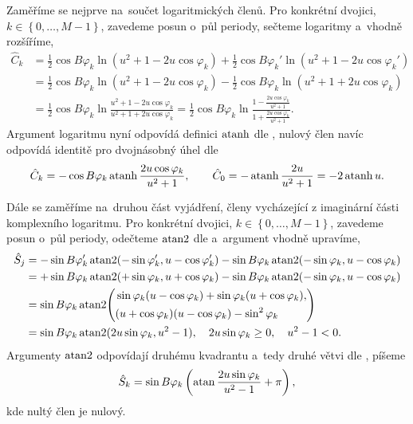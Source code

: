 Zaměříme se nejprve na~součet logaritmických členů. Pro konkrétní dvojici, $k\in\left\{{0,\dots,M-1}\right\}$, zavedeme posun o~půl periody, sečteme logaritmy a~vhodně rozšíříme,
\begin{align}
    \hat{C}_k&=\frac{1}{2}\cos{B\varphi_k}\ln(u^2+1-2u\cos\varphi_k)+\frac{1}{2}\cos{B\varphi_{k}'}\ln(u^2+1-2u\cos\varphi_{k}')\nonumber\\
    &=\frac{1}{2}\cos{B\varphi_k}\ln(u^2+1-2u\cos\varphi_k)-\frac{1}{2}\cos{B\varphi_{k}}\ln(u^2+1+2u\cos\varphi_{k})\nonumber\\
    &=\frac{1}{2}\cos{B\varphi_k}\ln\frac{u^2+1-2u\cos\varphi_k}{u^2+1+2u\cos\varphi_{k}}=\frac{1}{2}\cos{B\varphi_k}\ln\frac{1-\frac{2u\cos\varphi_k}{u^2+1}}{1+\frac{2u\cos\varphi_{k}}{u^2+1}}.
\end{align}
Argument logaritmu nyní odpovídá definici $\operatorname{atanh}$ dle , nulový člen navíc odpovídá identitě pro dvojnásobný úhel dle 
\begin{equation}
    \hat{C}_k=-\cos{B\varphi_k}\operatorname{atanh}\frac{2u\cos\varphi_k}{u^2+1},\qquad\hat{C}_{0}=-\operatorname{atanh}{\frac{2u}{u^2+1}}=-2\operatorname{atanh}{u}.
\end{equation}

Dále se zaměříme na~druhou část vyjádření, členy vycházející z imaginární části komplexního logaritmu. Pro konkrétní dvojici, $k \in \left\{ 0,\dots,M-1\right\}$, zavedeme posun o~půl periody, odečteme $\operatorname{atan2}$ dle  a~argument vhodně upravíme,
\begin{align}
    \hat{S}_j&=-\sin{B\varphi_k'}\operatorname{atan2}(-\sin \varphi_k',u-\cos \varphi_k')-\sin{B\varphi_k}\operatorname{atan2}(-\sin \varphi_k,u-\cos \varphi_k)
    \nonumber\\
    &=+\sin{B\varphi_k}\operatorname{atan2}(+\sin \varphi_k,u+\cos \varphi_k)-\sin{B\varphi_k}\operatorname{atan2}(-\sin \varphi_k,u-\cos \varphi_k)\nonumber\\
    &=\sin{B\varphi_k}\operatorname{atan2}\!\left(\begin{aligned}
        &\sin{\varphi_k}(u-\cos{\varphi_k})+\sin{\varphi_k}(u+\cos{\varphi_k}),\\
        &(u+\cos{\varphi_k})(u-\cos{\varphi_k})-\sin^2{\varphi_k}
    \end{aligned}\right)\nonumber\\
    &=\sin{B\varphi_k}\operatorname{atan2}(2u\sin{\varphi_k},u^2-1),\quad 2u\sin{\varphi_k}\ge0,\quad u^2-1<0.
\end{align}
Argumenty $\operatorname{atan2}$ odpovídají druhému kvadrantu a~tedy druhé větvi dle , píšeme
\begin{equation}
    \hat{S}_k=\sin{B \varphi_k} \left(\operatorname{atan}\frac{2u\sin{\varphi_k}}{u^2-1}+\pi\right),
\end{equation}
kde nultý člen je nulový.

